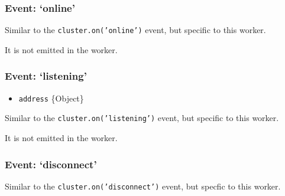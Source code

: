 \subsubsection{Event: `online'}\label{event-online-1}

Similar to the \texttt{cluster.on('online')} event, but specific to this
worker.

\begin{Shaded}
\begin{Highlighting}[]
\NormalTok{(}\NormalTok{, }\NormalTok{() \{}
\NormalTok{\});}
\end{Highlighting}
\end{Shaded}

It is not emitted in the worker.

\subsubsection{Event: `listening'}\label{event-listening-1}

\begin{itemize}
\itemsep1pt\parskip0pt
\item
  \texttt{address} \{Object\}
\end{itemize}

Similar to the \texttt{cluster.on('listening')} event, but specific to
this worker.

\begin{Shaded}
\begin{Highlighting}[]
\NormalTok{(}\NormalTok{, }
\NormalTok{\});}
\end{Highlighting}
\end{Shaded}

It is not emitted in the worker.

\subsubsection{Event: `disconnect'}\label{event-disconnect-1}

Similar to the \texttt{cluster.on('disconnect')} event, but specfic to
this worker.

\begin{Shaded}
\begin{Highlighting}[]
\NormalTok{(}\NormalTok{, }\NormalTok{() \{}
\NormalTok{\});}
\end{Highlighting}
\end{Shaded}

